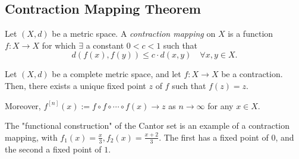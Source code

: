 \subsection{Contraction Mapping Theorem}

\begin{definition}
    Let $(X, d)$ be a metric space. A \emph{contraction mapping} on $X$ is a function $f: X \to X$ for which $\exists$ a constant $0 < c < 1$ such that \[
    d(f(x), f(y)) \leq c \cdot d(x, y) \quad \forall x, y \in X.    
    \]
\end{definition}

\begin{theorem}\label{thm:contractionmappingtheorem}
    Let $(X, d)$ be a complete metric space, and let $f : X \to X$ be a contraction. Then, there exists a unique fixed point $z$ of $f$ such that $f(z) = z$.
    
    Moreover, $f^{[n]}(x) := f\circ f\circ\cdots \circ f(x) \to z$ as $n \to \infty$ for any $x \in X$.
\end{theorem}
\begin{remark}
    The "functional construction" of the Cantor set is an example of a contraction mapping, with $f_1(x) = \frac{x}{3}, f_2(x) = \frac{x +2}{3}$. The first has a fixed point of $0$, and the second a fixed point of $1$.
\end{remark}


